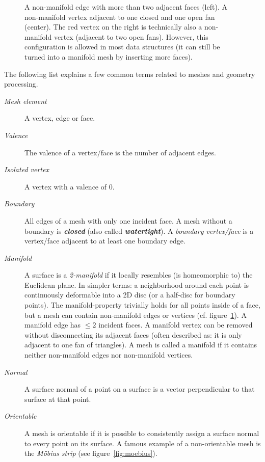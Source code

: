 \begin{figure}[t]
  
  \caption{
    A non-manifold edge with more than two adjacent faces (left).
    A non-manifold vertex adjacent to one closed and one open fan (center).
    The red vertex on the right is technically also a non-manifold vertex (adjacent to two open fans).
    However, this configuration is allowed in most data structures (it can still be turned into a manifold mesh by inserting more faces).}
  \label{fig:non-manifold}
\end{figure}

\newpage
The following list explains a few common terms related to meshes and geometry processing.

\begin{description}
  \item [\emph{Mesh element}] A vertex, edge or face.
  \item [\emph{Valence}] The valence of a vertex/face is the number of adjacent edges.
  \item [\emph{Isolated vertex}] A vertex with a valence of 0.
  \item [\emph{Boundary}] All edges of a mesh with only one incident face.
  A mesh without a boundary is \textbf{\emph{closed}} (also called \textbf{\emph{watertight}}).
  A \emph{boundary vertex/face} is a vertex/face adjacent to at least one boundary edge.
  \item [\emph{Manifold}] A surface is a \emph{2-manifold} if it locally resembles (is homeomorphic to) the Euclidean plane.
  In simpler terms: a neighborhood around each point is continuously deformable into a 2D disc (or a half-disc for boundary points).
  The manifold-property trivially holds for all points inside of a face, but a mesh can contain non-manifold edges or vertices (cf. figure~\ref{fig:non-manifold}).
  A manifold edge has $\le 2$ incident faces.
  A manifold vertex can be removed without disconnecting its adjacent faces (often described as: it is only adjacent to one fan of triangles).
  A mesh is called a manifold if it contains neither non-manifold edges nor non-manifold vertices.
  \item [\emph{Normal}] A surface normal of a point on a surface is a vector perpendicular to that surface at that point.
  \item [\emph{Orientable}] A mesh is orientable if it is possible to consistently assign a surface normal to every point on its surface.
  A famous example of a non-orientable mesh is the \emph{Möbius strip} (see figure~\ref{fig:moebius}).
\end{description}

